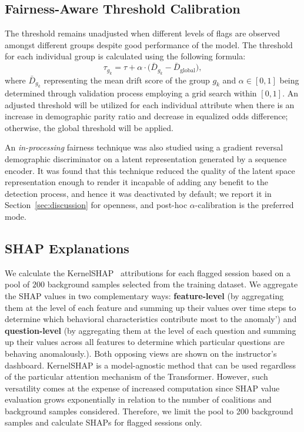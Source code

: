 \documentclass[sigconf]{acmart}
\begin{document}
\subsection{Fairness-Aware Threshold Calibration}
The threshold remains unadjusted when different levels of flags are observed amongst different groups despite good performance of the model. The threshold for each individual group is calculated using the following formula: 
\begin{equation}
\tau_{g_k} = \tau + \alpha \cdot \bigl(\bar{D}_{g_k} - \bar{D}_{\text{global}}\bigr),
\end{equation}
where $\bar{D}_{g_k}$ representing the mean drift score of the group $g_k$ and $\alpha \in [0,1]$  being determined through validation process employing a grid search within $[0, 1]$. An adjusted threshold will be utilized for each individual attribute when there is an increase in demographic parity ratio and decrease in equalized odds difference; otherwise, the global threshold will be applied.

An \emph{in-processing} fairness technique was also studied using a gradient reversal demographic discriminator on a latent representation generated by a sequence encoder. It was found that this technique reduced the quality of the latent space representation enough to render it incapable of adding any benefit to the detection process, and hence it was deactivated by default; we report it in Section~\ref{sec:discussion} for openness, and post-hoc $\alpha$-calibration is the preferred mode.

\subsection{SHAP Explanations}
We calculate the KernelSHAP~\cite{lundberg2017unified} attributions for each flagged session based on a pool of $200$ background samples selected from the training dataset. We aggregate the SHAP values in two complementary ways: \textbf{feature-level} (by aggregating them at the level of each feature and summing up their values over time steps to determine which behavioral characteristics contribute most to the anomaly') and \textbf{question-level} (by aggregating them at the level of each question and summing up their values across all features to determine which particular questions are behaving anomalously.). Both opposing views are shown on the instructor's dashboard. KernelSHAP is a model-agnostic method that can be used regardless of the particular attention mechanism of the Transformer. However, such versatility comes at the expense of increased computation since SHAP value evaluation grows exponentially in relation to the number of coalitions and background samples considered. Therefore, we limit the pool to 200 background samples and calculate SHAPs for flagged sessions only.
\end{document}
